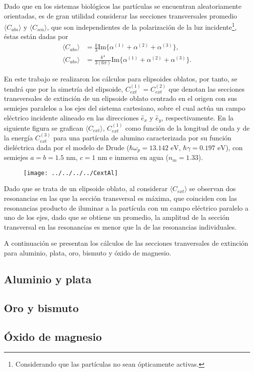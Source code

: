 Dado que en los sistemas biológicos las partículas se encuentran aleatoriamente orientadas, es de gran utilidad considerar las secciones transversales promedio $\langle C_{abs}\rangle$ y $\langle C_{sca}\rangle$, que son independientes de la polarización de la luz incidente\footnote{Considerando que las partículas no sean ópticamente activas.}, éstas están dadas por \cite{Bohren}
\begin{align*}
	\langle C_{abs}\rangle &= \frac{k}{3} \text{Im}\{\alpha^{(1)}+\alpha^{(2)}+\alpha^{(3)}\},\\
	\langle C_{abs}\rangle &= \frac{k^4}{3(6\pi)} \text{Im}\{\alpha^{(1)}+\alpha^{(2)}+\alpha^{(3)}\}.
\end{align*}

En este trabajo se realizaron los cálculos para elipsoides oblatos, por tanto, se tendrá que por la simetría del elipsoide, $C_{ext}^{(1)}=C_{ext}^{(2)}$ que denotan las secciones transversales de extinción de un elipsoide oblato centrado en el origen con sus semiejes paralelos a los ejes del sistema cartesiano, sobre el cual actúa un campo eléctrico incidente alineado en las direcciones $\hat{e}_x$ y $\hat{e}_y$, respectivamente. En la siguiente figura se grafican $\langle C_{ext}\rangle$, $C_{ext}^{(1)}$ como función de la longitud de onda y de la energía $C_{ext}^{(3)}$ para una partícula de alumino caracterizada por su función dieléctrica dada por el modelo de Drude ($\hbar\omega_p=13.142\text{ eV}$, $\hbar\gamma=0.197\text{ eV}$), con semiejes $a=b=1.5\text{ nm}$, $c=1\text{ nm}$ e inmersa en agua ($n_m=1.33$).

\begin{figure}[h!]
	\texttt{[image: ../../../../CextAl]}
\end{figure}

Dado que se trata de un elipsoide oblato, al considerar $\langle C_{ext}\rangle$ se observan dos resonancias en las que la sección transversal es máxima, que coinciden con las resonancias producto de iluminar a la partícula con un campo eléctrico paralelo a uno de los ejes, dado que se obtiene un promedio, la amplitud de la sección transversal en las resonancias es menor que la de las resonancias individuales.

A continuación se presentan los cálculos de las secciones tranversales de extinción para aluminio, plata, oro, bismuto y óxido de magnesio.

\subsection*{Aluminio y plata}

\subsection*{Oro y bismuto}

\subsection*{Óxido de magnesio}







